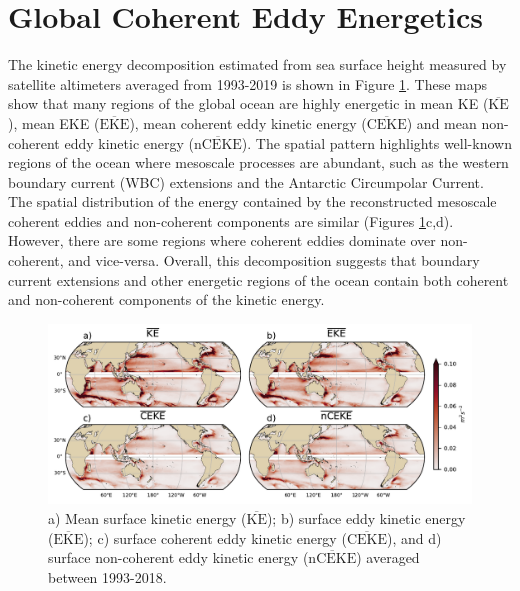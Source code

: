 \documentclass[draft,linenumbers]{agujournal2019}
\newcommand{\MKE}{\overline{\textrm{KE}}}
\newcommand{\MEKE}{\overline{\textrm{EKE}}}
\newcommand{\MCEKE}{\overline{\textrm{CEKE}}}
\newcommand{\MnCEKE}{\overline{\textrm{nCEKE}}}
\begin{document}
	\section{Global Coherent Eddy Energetics}
	\label{sec:CEKE_climatology}


	The kinetic energy decomposition estimated from sea surface height measured by satellite altimeters averaged from 1993-2019 is shown in Figure \ref{fig:eddy_climatology}. 
	These maps show that many regions of the global ocean are highly energetic in mean KE ($\MKE$), mean EKE ($\MEKE$), mean coherent eddy kinetic energy ($\MCEKE$) and mean non-coherent eddy kinetic energy ($\MnCEKE$). 
	The spatial pattern highlights well-known regions of the ocean where mesoscale processes are abundant, such as the western boundary current (WBC) extensions and the Antarctic Circumpolar Current. 
	The spatial distribution of the energy contained by the reconstructed mesoscale coherent eddies and non-coherent components are similar (Figures \ref{fig:eddy_climatology}c,d). 
	However, there are some regions where coherent eddies dominate over non-coherent, and vice-versa. 
	Overall, this decomposition suggests that boundary current extensions and other energetic regions of the ocean contain both coherent and non-coherent components of the kinetic energy.

	\begin{figure}[t]
	    \centering
	    \includegraphics[width=1\textwidth]{./figures/mean_ke_maps_satellite.pdf}
	    \caption{a) Mean surface kinetic energy ($\MKE$); b) surface eddy kinetic energy ($\MEKE$); c) surface coherent eddy kinetic energy ($\MCEKE$), and d) surface non-coherent eddy kinetic energy ($\MnCEKE$) averaged between 1993-2018.}
	    \label{fig:eddy_climatology}
	\end{figure}
\end{document}
